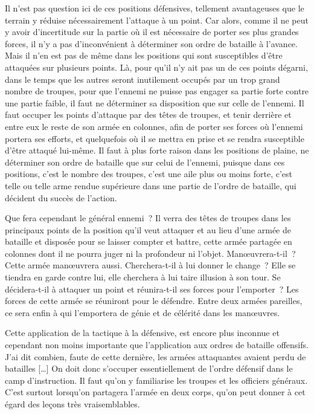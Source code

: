 \documentclass[french,twoside]{book} %
\begin{document}
Il n’est pas question ici de ces positions défensives, tellement avantageuses que le terrain y réduise nécessairement l’attaque à un point. Car alors, comme il ne peut y avoir d’incertitude sur la partie où il est nécessaire de porter ses plus grandes forces, il n’y a pas d’inconvénient à déterminer son ordre de bataille à l’avance. Mais il n’en est pas de même dans les positions qui sont susceptibles d’être attaquées sur plusieurs points. Là, pour qu’il n’y ait pas un de ces points dégarni, dans le temps que les autres seront inutilement occupés par un trop grand nombre de troupes, pour que l’ennemi ne puisse pas engager sa partie forte contre une partie faible, il faut ne déterminer sa disposition que sur celle de l’ennemi. Il faut occuper les points d’attaque par des têtes de troupes, et tenir derrière et entre eux le reste de son armée en colonnes, afin de porter ses forces où l’ennemi portera ses efforts, et quelquefois où il se mettra en prise et se rendra susceptible d’être attaqué lui-même. Il faut à plus forte raison dans les positions de plaine, ne déterminer son ordre de bataille que sur celui de l’ennemi, puisque dans ces positions, c’est le nombre des troupes, c’est une aile plus ou moins forte, c’est telle ou telle arme rendue supérieure dans une partie de l’ordre de bataille, qui décident du succès de l’action.\par
Que fera cependant le général ennemi ? Il verra des têtes de troupes dans les principaux points de la position qu’il veut attaquer et au lieu d’une armée de bataille et disposée pour se laisser compter et battre, cette armée partagée en colonnes dont il ne pourra juger ni la profondeur ni l’objet. Manœuvrera-t-il ? Cette armée manœuvrera aussi. Cherchera-t-il à lui donner le change ? Elle se tiendra en garde contre lui, elle cherchera à lui taire illusion à son tour. Se décidera-t-il à attaquer un point et réunira-t-il ses forces pour l’emporter ? Les forces de cette armée se réuniront pour le défendre. Entre deux armées pareilles, ce sera enfin à qui l’emportera de génie et de célérité dans les manœuvres.\par
Cette application de la tactique à la défensive, est encore plus inconnue et cependant non moins importante que l’application aux ordres de bataille offensifs. J’ai dit combien, faute de cette dernière, les armées attaquantes avaient perdu de batailles […] On doit donc s’occuper essentiellement de l’ordre défensif dans le camp d’instruction. Il faut qu’on y familiarise les troupes et les officiers généraux. C’est surtout lorsqu’on partagera l’armée en deux corps, qu’on peut donner à cet égard des leçons très vraisemblables.\par
\end{document}
